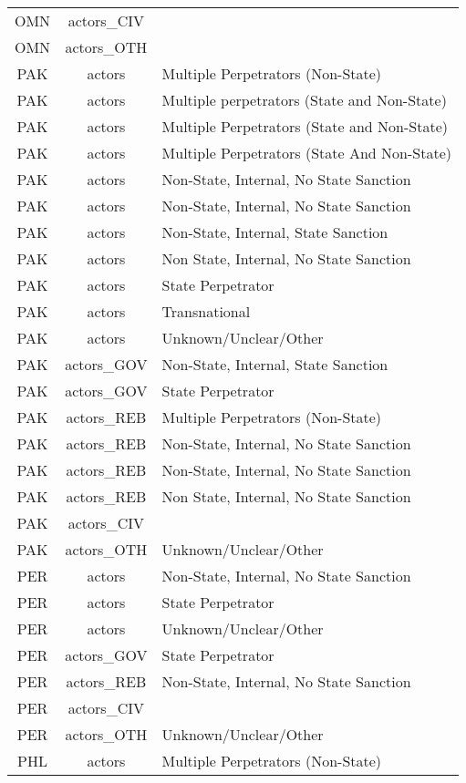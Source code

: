\documentclass[12pt]{article}
\begin{document}
\begin{center}
\begin{longtable}{|c|c|p{10cm}|}
  OMN & actors\_CIV &  \\ 
  OMN & actors\_OTH &  \\ 
  PAK & actors & Multiple Perpetrators (Non-State) \\ 
  PAK & actors & Multiple perpetrators (State and Non-State) \\ 
  PAK & actors & Multiple Perpetrators (State and Non-State) \\ 
  PAK & actors & Multiple Perpetrators (State And Non-State) \\ 
  PAK & actors & Non-State, Internal, No State Sanction \\ 
  PAK & actors & Non-State, Internal, No State Sanction \\ 
  PAK & actors & Non-State, Internal, State Sanction \\ 
  PAK & actors & Non State, Internal, No State Sanction \\ 
  PAK & actors & State Perpetrator \\ 
  PAK & actors & Transnational \\ 
  PAK & actors & Unknown/Unclear/Other \\ 
  PAK & actors\_GOV & Non-State, Internal, State Sanction \\ 
  PAK & actors\_GOV & State Perpetrator \\ 
  PAK & actors\_REB & Multiple Perpetrators (Non-State) \\ 
  PAK & actors\_REB & Non-State, Internal, No State Sanction \\ 
  PAK & actors\_REB & Non-State, Internal, No State Sanction \\ 
  PAK & actors\_REB & Non State, Internal, No State Sanction \\ 
  PAK & actors\_CIV &  \\ 
  PAK & actors\_OTH & Unknown/Unclear/Other \\ 
  PER & actors & Non-State, Internal, No State Sanction \\ 
  PER & actors & State Perpetrator \\ 
  PER & actors & Unknown/Unclear/Other \\ 
  PER & actors\_GOV & State Perpetrator \\ 
  PER & actors\_REB & Non-State, Internal, No State Sanction \\ 
  PER & actors\_CIV &  \\ 
  PER & actors\_OTH & Unknown/Unclear/Other \\ 
  PHL & actors & Multiple Perpetrators (Non-State) \\ 

\end{longtable}
\end{center}
\end{document}
